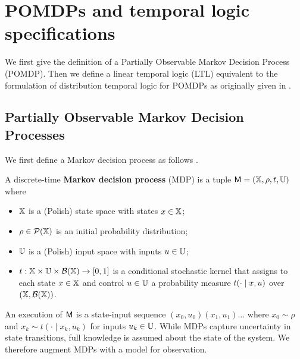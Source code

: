 \documentclass{ifacconf}
\newcommand{\new}[1]{{\color{blue}#1}}
\newcommand{\cristi}[1]{{\color{orange}#1}}
\begin{document}
\section{POMDPs and temporal logic specifications}

We first give the definition of a Partially Observable Markov Decision Process (POMDP). Then we define a linear temporal logic (LTL) equivalent to the formulation of distribution temporal logic for POMDPs as originally given in \citep{JonesDTL2013}.

\subsection{Partially Observable Markov  Decision Processes}

We first define a Markov decision process as follows \citep{hll1996}.
\begin{definition}
\label{def:MDP}
  A discrete-time \textbf{Markov decision process} (MDP) is a tuple $\mathsf{M} = ({\mathbb{X}}, \rho, t, {\mathbb{U}})$ where
  \begin{itemize}
    \item ${\mathbb{X}}$ is a \new{(Polish)} state space with states $x\in{\mathbb{X}}$; %
    \item $\rho \in \mathcal P({\mathbb{X}})$ is an initial probability distribution;
    \item ${\mathbb{U}}$ is a \new{(Polish)} input space with inputs $u\in{\mathbb{U}}$;
    \item $t:{\mathbb{X}}\times{\mathbb{U}}\times\mathcal B({\mathbb{X}})\rightarrow[0,1]$ is a conditional stochastic kernel that assigns to each state $x\in {\mathbb{X}}$ and control $u\in {\mathbb{U}}$ a probability measure $t(\cdot\mid x,u)$ over $({\mathbb{X}},\mathcal B({\mathbb{X}}))$.
  \end{itemize}
\end{definition}

An execution of $\mathsf{M}$ is a state-input sequence $(x_0, u_0)(x_1, u_1)\ldots$ where $x_0 \sim \rho$ and $x_k \sim t(\cdot \mid x_k, u_k)$ for inputs $u_k \in {\mathbb{U}}$. While MDPs capture uncertainty in state transitions, full knowledge is assumed about the state of the system. We therefore augment MDPs with a model for observation.

\end{document}
